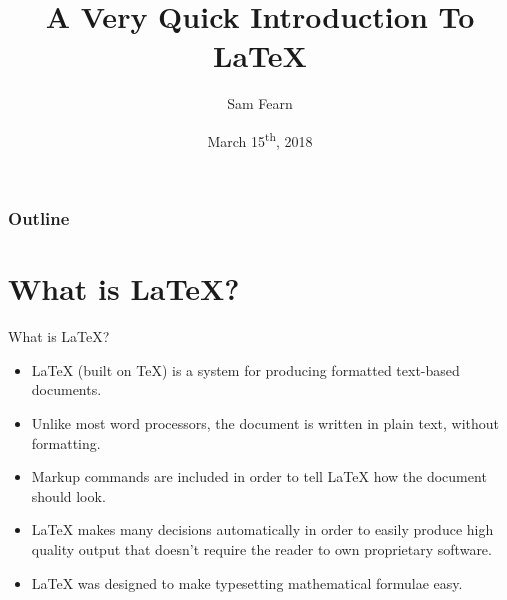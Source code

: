 \documentclass{beamer}
\author{Sam Fearn}
\title{A Very Quick Introduction To \LaTeX{}}
\date{March 15\textsuperscript{th}, 2018}
\begin{document}
    


{

\begin{frame}[plain]
\maketitle
\end{frame}
}

\begin{frame}
       \frametitle{Outline}
       \tableofcontents
\end{frame}

\section{What is \LaTeX{}?}
\label{sec:introduction}
\begin{frame}{What is \LaTeX{}?}
	\begin{itemize}
		\item<1-> \LaTeX{} (built on \TeX{}) is a system for producing formatted text-based documents.
		\item <2-> Unlike most word processors, the document is written in plain text, without formatting.
		\item <3-> Markup commands are included in order to tell \LaTeX{} how the document should look.
		\item <4-> \LaTeX{} makes many decisions automatically in order to easily produce high quality output that doesn't require the reader to own proprietary software.
		\item <5-> \LaTeX{} was designed to make typesetting mathematical formulae easy.
	\end{itemize}
\end{frame}
\end{document}
